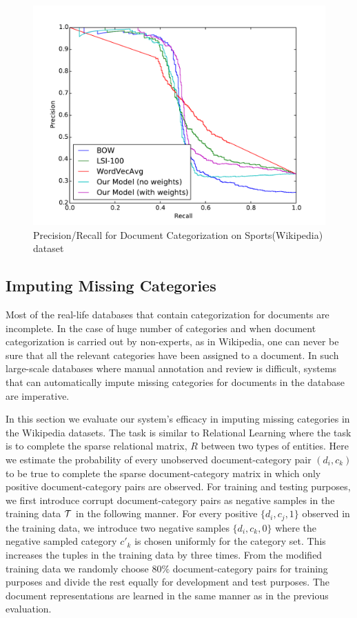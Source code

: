 \begin{figure}[tb]
\centering
        \includegraphics[width=0.8\columnwidth]{figs/pr/sports-cs.pdf}
    \caption{\footnotesize Precision/Recall for Document Categorization on Sports(Wikipedia) dataset}
    \label{fig:pr:sports:cs} 
\end{figure}

\subsection{Imputing Missing Categories}
\label{sec:results:imputing}
Most of the real-life databases that contain categorization for documents are incomplete. In the case of huge number of categories and when document categorization is carried out by non-experts, as in Wikipedia, one can never be sure that all the relevant categories have been assigned to a document. In such large-scale databases where manual annotation and review is difficult, systems that can automatically impute missing categories for documents in the database are imperative.

In this section we evaluate our system's efficacy in imputing missing categories in the Wikipedia datasets.  
The task is similar to Relational Learning where the task is to complete the sparse relational matrix, $R$ between two types of entities. 
Here we estimate the probability of every unobserved document-category pair $(d_{i}, c_{k})$ to be true to complete the sparse document-category matrix in which only positive document-category pairs are observed.
For training and testing purposes, we first introduce corrupt document-category pairs as negative samples in the training data $\mathcal{T}$ in the following manner. For every positive $\{ d_{i}, c_{j}, 1\}$ observed in the training data, we introduce two negative samples $\{ d_{i}, c_{k}, 0\}$ where the negative sampled category $c'_{k}$ is chosen uniformly for the category set. This increases the tuples in the training data by three times. From the modified training data we randomly choose $80\%$ document-category pairs for training purposes and divide the rest equally for development and test purposes. The document representations are learned in the same manner as in the previous evaluation.

